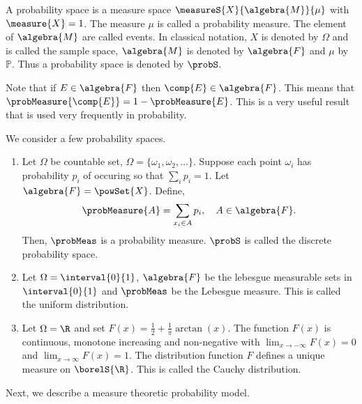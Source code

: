 \begin{Definition}[name=Probability space]
    A probability space  is a measure space $\measureS{X}{\algebra{M}}{\mu}$ with $\measure{X} = 1$. The
    measure $\mu$ is called a probability measure. The element of $\algebra{M}$ are called events.
    In classical notation, $X$ is denoted by $\Omega$ and is called the sample space, 
    $\algebra{M}$ is denoted by $\algebra{F}$ and
    $\mu$ by $\mathbb{P}$. Thus a probability space is denoted by $\probS$.
\end{Definition}
Note that if $E \in \algebra{F}$ then $\comp{E} \in \algebra{F}$. This means that
$\probMeasure{\comp{E}} = 1 - \probMeasure{E}$. This is a very useful result that is used very
frequently in probability.
\begin{Example}
    We consider a few probability spaces.
    \begin{enumerate}
	\item
	    Let $\Omega$ be countable set, $\Omega = \lbrace\omega_1,\omega_2,\dots\rbrace$. Suppose each
	    point $\omega_i$ has probability $p_i$ of occuring so that $\sum\limits_{i}p_i = 1$. Let
	    $\algebra{F} = \powSet{X}$. Define,
	    \[\probMeasure{A} = \sum\limits_{x_i\in A}p_i,\quad A\in\algebra{F}.\]
	    Then, $\probMeas$ is a probability measure. $\probS$ is called
	    the discrete probability space.
	\item
	    Let $\Omega = \interval{0}{1}$, $\algebra{F}$ be the lebesgue measurable sets in
	    $\interval{0}{1}$ and $\probMeas$ be the Lebesgue measure. This is called the uniform
	    distribution. 
	\item
	    Let $\Omega = \R$ and set $F(x) = \frac{1}{2} + \frac{1}{\pi}\arctan(x)$. The function
	    $F(x)$ is continuous, monotone increasing and non-negative with 
	    $\lim_{x\to-\infty}F(x) = 0$ and  $\lim_{x\to\infty}F(x) = 1$. The distribution function
	    $F$ defines a unique measure on $\borelS{\R}$. This is called the Cauchy distribution.
    \end{enumerate}
\end{Example}
Next, we describe a measure theoretic probability model.

